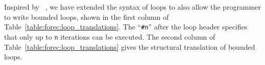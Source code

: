 \begin{table}
	\centering
	\def\arraystretch{1.3}
	
\end{table}


Inspired by \pretc{}~\cite{pret_pretc}, 
we have extended the syntax of loops to also allow 
the programmer to write 
bounded loops, shown in the first column of Table~\ref{table:forec:loop_translations}. 
The ``\verb$#n$'' after the loop header specifies 
that only up to \verb$n$ iterations can be executed.
The second column of Table~\ref{table:forec:loop_translations}
gives the structural translation of bounded loops. 
